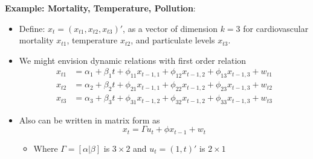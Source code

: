 \documentclass[11pt]{article}
\newcommand{\noi}{\noindent}
\begin{document}
\noi \textbf{Example: Mortality, Temperature, Pollution}: \\
\begin{itemize}
    \item Define: $x_t = (x_{t1}, x_{t2}, x_{t3})'$, as a vector of dimension $k=3$ for cardiovascular mortality $x_{t1}$, temperature $x_{t2}$, and particulate levels $x_{t3}$.
    \item We might envision dynamic relations with first order relation
        \begin{align*}
            x_{t1} &= \alpha_1 + \beta_1t + \phi_{11}x_{t-1,1} + \phi_{12}x_{t-1,2} + \phi_{13}x_{t-1,3} + w_{t1} \\
            x_{t2} &= \alpha_2 + \beta_2t + \phi_{21}x_{t-1,1} + \phi_{22}x_{t-1,2} + \phi_{23}x_{t-1,3} + w_{t2} \\
            x_{t3} &= \alpha_3 + \beta_3t + \phi_{31}x_{t-1,2} + \phi_{32}x_{t-1,2}  + \phi_{33}x_{t-1,3} + w_{t3} 
        \end{align*}
    \item Also can be written in matrix form as
        $$x_t = \Gamma u_t + \phi x_{t-1} + w_t$$
        \begin{itemize}
            \item Where $\Gamma = [\alpha|\beta]$ is $3 \times 2$ and $u_t = (1,t)'$ is $2 \times 1$
        \end{itemize}
\end{itemize} \phantom{i}
\end{document}
